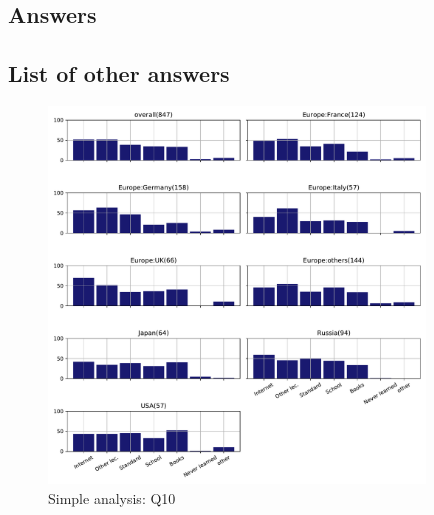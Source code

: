 
\subsection{Answers}


\subsection{List of other answers}
\begin{itemize}

\end{itemize}

\begin{figure}[htb]
\begin{center}
\includegraphics[width=10cm]{../pdfs/Q10.pdf}
\caption{Simple analysis: Q10}
\label{fig:Q10}
\end{center}
\end{figure}
